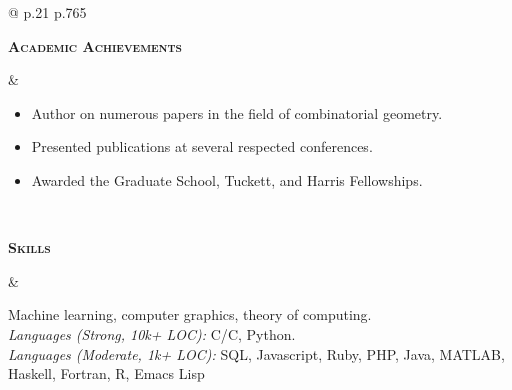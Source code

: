 \documentclass[11pt]{article}
\def\cpp{{C\nolinebreak[4]\hspace{-.05em}\raisebox{.4ex}{\tiny\bf ++}}}
\newcommand{\titlecell}[1]{%
    \begin{minipage}[t]{\linewidth}
        \raggedleft \textbf{#1}
    \end{minipage}}
\newcommand{\contentcell}[1]{%
    \begin{minipage}[t]{\linewidth}
        #1
    \end{minipage}}
\newcommand{\tablerowskip}{\vspace{4.83mm} \\}
\begin{document}
\begin{tabular}{@{} p{.21\textwidth} p{.765\textwidth}}
    \titlecell{\textsc{Academic Achievements}} &
    \contentcell{
        \begin{itemize}[itemsep=0pt,topsep=0pt,leftmargin=*] \itemsep -2pt
            \item Author on numerous papers in the field of combinatorial geometry.
            \item Presented publications at several respected conferences.
            \item Awarded the Graduate School, Tuckett, and Harris Fellowships.
        \end{itemize}
    }
    \tablerowskip

    \titlecell{\textsc{Skills}} &
    \contentcell{
        Machine learning, computer graphics, theory of computing. \\
        {\sl Languages (Strong, 10k+ LOC):} C/\cpp, Python. \\
        {\sl Languages (Moderate, 1k+ LOC):} SQL, Javascript, Ruby, PHP, Java, MATLAB, Haskell, Fortran, R, Emacs Lisp
    }
\end{tabular}

\end{document}
